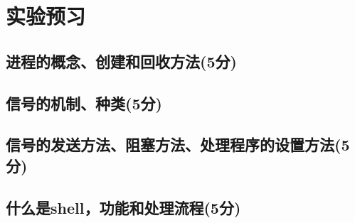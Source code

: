 \section{实验预习}
\subsection{进程的概念、创建和回收方法(5分)}

\subsection{信号的机制、种类(5分)}

\subsection{信号的发送方法、阻塞方法、处理程序的设置方法(5分)}

\subsection{什么是shell，功能和处理流程(5分)}
